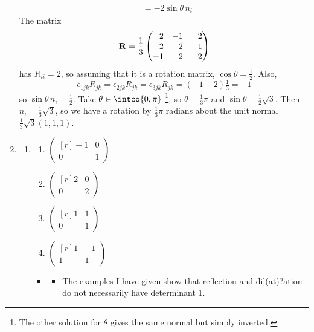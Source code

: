 \documentclass[fleqn,a4paper,11pt]{article}
\begin{document}
\begin{enumerate}[label=\textbf{\arabic*.}]
\begin{align*}
      &= - 2 \sin\theta\,n_i
    \end{align*}
    The matrix
    \begin{equation*}
     \mat R = \frac 13
     \begin{pmatrix*}[r]
      2 & -1 & 2 \\
      2 & 2 & -1 \\
      -1 & 2 & 2
     \end{pmatrix*}
    \end{equation*}
    has \(R_{ii} = 2\), so assuming that it is a rotation matrix,
    \(\cos \theta = \frac 12\). Also,
    \begin{equation*}
     \epsilon_{1jk} R_{jk} = \epsilon_{2jk} R_{jk} = \epsilon_{3jk} R_{jk}
      = (-1 - 2) \tfrac 13 = -1
    \end{equation*}
    so \(\sin\theta\,n_i = \frac 12\). Take \(\theta \in \intco{0, \pi}\)
    \footnote{
    The other solution for \(\theta\) gives the same normal but simply inverted.
    }, so
    \(\theta = \frac 13 \pi\) and \(\sin\theta = \frac 12 \sqrt 3\). Then
    \(n_i = \frac 13 \sqrt 3\), so we have a rotation by \(\frac 13 \pi\)
    radians about the unit normal \(\frac 13 \sqrt 3(1, 1, 1)\).
   \item
    \begin{enumerate}[label=(\alph*)]
     \item
      \begin{enumerate}[label=(\roman*)]
       \item \(
        \begin{pmatrix*}[r]
         -1 & 0 \\
         0 & 1
        \end{pmatrix*} \)
       \item \(
        \begin{pmatrix*}[r]
         2 & 0 \\
         0 & 2
        \end{pmatrix*} \)
       \item \(
        \begin{pmatrix*}[r]
         1 & 1 \\
         0 & 1
        \end{pmatrix*} \)
       \item \(
        \begin{pmatrix*}[r]
         1 & -1 \\
         1 & 1
        \end{pmatrix*} \)
      \end{enumerate}
      \begin{itemize}
       \item
        \begin{itemize}
         \item
          The examples I have given show that reflection and
          dil(at)?ation do not necessarily have determinant 1.


\end{itemize}
\end{itemize}
\end{enumerate}
\end{enumerate}
\end{document}
